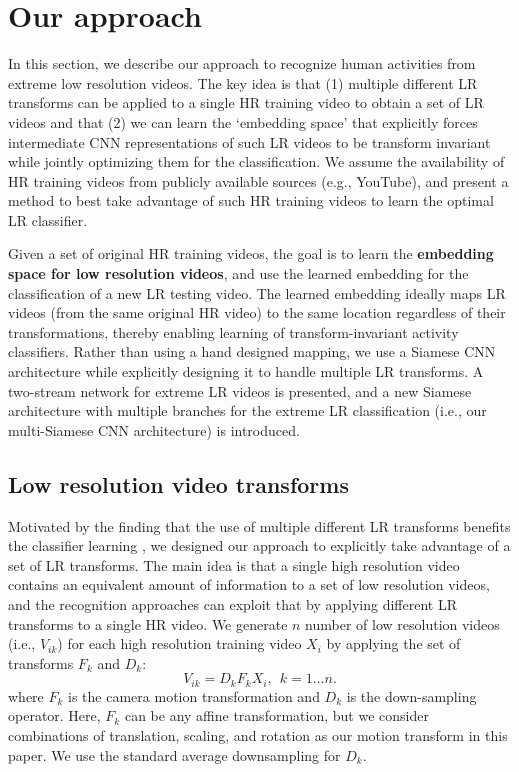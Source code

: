 \documentclass[letterpaper]{article} %
\begin{document}
\section{Our approach}

In this section, we describe our approach to recognize human activities from extreme low resolution videos. The key idea is that (1) multiple different LR transforms can be applied to a single HR training video to obtain a set of LR videos and that (2) we can learn the `embedding space' that explicitly forces intermediate CNN representations of such LR videos to be transform invariant while jointly optimizing them for the classification. We assume the availability of HR training videos from publicly available sources (e.g., YouTube), and present a method to best take advantage of such HR training videos to learn the optimal LR classifier.


Given a set of original HR training videos, the goal is to learn the \textbf{embedding space for low resolution videos}, and use the learned embedding for the classification of a new LR testing video. The learned embedding ideally maps LR videos (from the same original HR video) to the same location regardless of their transformations, thereby enabling learning of transform-invariant activity classifiers. Rather than using a hand designed mapping, we use a Siamese CNN architecture while explicitly designing it to handle multiple LR transforms. A two-stream network for extreme LR videos is presented, and a new Siamese architecture with multiple branches for the extreme LR classification (i.e., our multi-Siamese CNN architecture) is introduced.




\subsection{Low resolution video transforms}
\label{subsec:lr}





Motivated by the finding that the use of multiple different LR transforms benefits the classifier learning \cite{ryoo17privacy}, we designed our approach to explicitly take advantage of a set of LR transforms. The main idea is that a single high resolution video contains an equivalent amount of information to a set of low resolution videos, and the recognition approaches can exploit that by applying different LR transforms to a single HR video. We generate $n$ number of low resolution videos (i.e., $V_{ik}$) for each high resolution training video $X_i$ by applying the set of transforms $F_k$ and $D_k$:
\begin{equation}
    V_{ik} = D_k F_k X_i, ~~k = 1 \ldots n.
\end{equation}
where $F_k$ is the camera motion transformation and $D_k$ is the down-sampling operator. Here, $F_k$ can be any affine transformation, but we consider combinations of translation, scaling, and rotation as our motion transform in this paper. We use the standard average downsampling for $D_k$.
\end{document}
